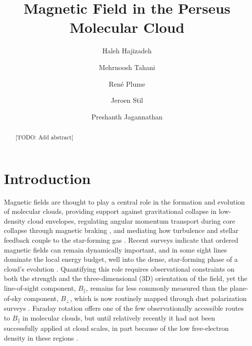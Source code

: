 \documentclass[twocolumn]{aastex631}
\begin{document}
\title{Magnetic Field in the Perseus Molecular Cloud}


\author{Haleh Hajizadeh}


\author{Mehrnoosh Tahani}

\author{René Plume}

\author{Jeroen Stil}



\author{Preshanth Jagannathan}


\begin{abstract}
[TODO: Add abstract]
\end{abstract}



\section{Introduction}
\label{sec:intro}

Magnetic fields are thought to play a central role in the formation and evolution of molecular clouds, providing support against gravitational collapse in low-density cloud envelopes, regulating angular momentum transport during core collapse through magnetic braking \citep{pudritz2019}, and mediating how turbulence and stellar feedback couple to the star-forming gas \citep{krumholz2019}. Recent surveys indicate that ordered magnetic fields can remain dynamically important, and in some sight lines dominate the local energy budget, well into the dense, star-forming phase of a cloud's evolution \citep{barnes2025}. Quantifying this role requires observational constraints on both the strength and the three-dimensional (3D) orientation of the field, yet the line-of-sight component, $B_\parallel$, remains far less commonly measured than the plane-of-sky component, $B_\perp$, which is now routinely mapped through dust polarization surveys \citep{planck2016, pattle2023}. Faraday rotation offers one of the few observationally accessible routes to $B_\parallel$ in molecular clouds, but until relatively recently it had not been successfully applied at cloud scales, in part because of the low free-electron density in these regions \citep{wolleben2004}.
\end{document}
